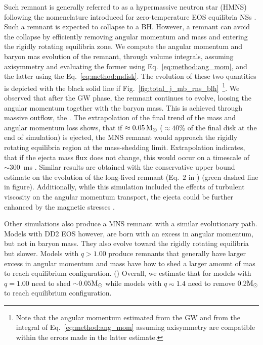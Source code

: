 Such remnant is generally referred to as a hypermassive neutron star (HMNS) following the 
nomenclature introduced for zero-temperature EOS equilibria \acp{NS} \citep{Baumgarte:1999cq}.
Such a remnant is expected to collapse to a BH. 
However, a remnant can avoid the collapse by efficiently removing angular momentum
and mass and entering the rigidly rotating equilibria zone. 
We compute the angular momentum and baryon mas evolution of the remnant, 
through volume integrals, assuming axisymmetry and evaluating the former using Eq.~\eqref{eq:method:ang_mom}, and the latter using the Eq.~\eqref{eq:method:mdisk}. 
The evolution of these two quantities is depicted with the black solid line if 
Fig.~\eqref{fig:total_j_mb_rns_blh}~\footnote{Note that the angular momentum estimated
    from the GW and from the integral of Eq.~\eqref{eq:method:ang_mom} assuming
    axisymmetry are compatible within the errors made in the latter estimate.
}.
We observed that after the \ac{GW} phase, the remnant continues to evolve, loosing the 
angular momentum together with the baryon mass. This is achieved through massive outflow,
the \swind{}. 
The extrapolation of the final trend of the mass and angular momentum loss shows, that 
if $\approx0.05\,{\text{M}_{\odot}}$ ($\approx40$\% of the final disk at the end of simulation) is 
ejected, the \ac{MNS} remnant would approach the rigidly rotating equilibria region 
at the mass-shedding limit. Extrapolation indicates, that if the ejecta mass flux does 
not change, this would occur on a timescale of $\sim 300$~ms \pmerg{}.
Similar results are obtained with the conservative upper bound estimate on the 
evolution of the long-lived remnant (Eq.~$2$ in \citet{Radice:2018xqa}) (green dashed line in figure).
Additionally, while this simulation included the effects of turbulent viscosity on the
angular momentum transport, the ejecta could be further enhanced by the magnetic stresses 
\citep{Metzger:2006mw,Bucciantini:2011kx,Siegel:2017nub,Fernandez:2018kax,Ciolfi:2020hgg}.

Other simulations also produce a \ac{MNS} remnant with a similar evolutionary path. 
Models with DD2 \ac{EOS} however, are born with an excess in angular momentum, but not in 
baryon mass. They also evolve toward the rigidly rotating equilibria but slower.
Models with $q>1.00$ produce remnants that generally have larger excess in angular momentum 
and mass have how to shed a larger amount of mas to reach equilibrium configuration.
()
Overall, we estimate that for models with $q=1.00$ need to shed ${\sim}0.05{\text{M}_{\odot}}$ while 
models with $q\eqsim 1.4$ need to remove $0.2{\text{M}_{\odot}}$ to reach equilibrium configuration.



